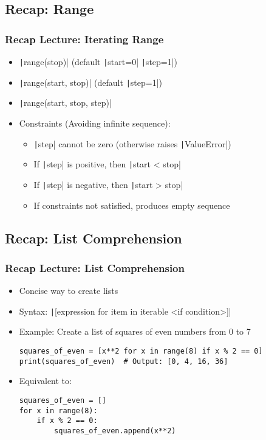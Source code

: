 \documentclass{beamer}
\begin{document}
\subsection{Recap: Range}
\begin{frame}
    \frametitle{Recap Lecture: Iterating Range}
    \begin{itemize}
        \item \texttt|range(stop)| (default \texttt|start=0| \texttt|step=1|)
        \item \texttt|range(start, stop)| (default \texttt|step=1|)
        \item \texttt|range(start, stop, step)|
        \item Constraints (Avoiding infinite sequence):
              \begin{itemize}
                  \item \texttt|step| cannot be zero (otherwise raises \texttt|ValueError|)
                  \item If \texttt|step| is positive, then \texttt|start < stop|
                  \item If \texttt|step| is negative, then \texttt|start > stop|
                  \item If constraints not satisfied, produces empty sequence
              \end{itemize}
    \end{itemize}
\end{frame}

\subsection{Recap: List Comprehension}
\begin{frame}[fragile]
    \frametitle{Recap Lecture: List Comprehension}
    \begin{itemize}
        \item Concise way to create lists
        \item Syntax: \texttt|[expression for item in iterable <if condition>]|
        \item Example: Create a list of squares of even numbers from 0 to 7
              \begin{verbatim}
squares_of_even = [x**2 for x in range(8) if x % 2 == 0]
print(squares_of_even)  # Output: [0, 4, 16, 36]
              \end{verbatim}
        \item Equivalent to:
              \begin{verbatim}
squares_of_even = []
for x in range(8):
    if x % 2 == 0:
        squares_of_even.append(x**2)
              \end{verbatim}
    \end{itemize}
\end{frame}
\end{document}
